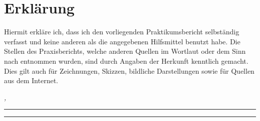 %
\chapter*{Erklärung}
\label{sec:declaration}
\thispagestyle{empty}

Hiermit erkläre ich, dass ich den vorliegenden Praktikumsbericht selbständig verfasst und keine anderen als die angegebenen Hilfsmittel benutzt habe.
Die Stellen des Praxisberichts, welche anderen Quellen im Wortlaut oder dem Sinn nach entnommen wurden, sind durch Angaben der Herkunft kenntlich gemacht.
Dies gilt auch für Zeichnungen, Skizzen, bildliche Darstellungen sowie für Quellen aus dem Internet.

\bigskip

\noindent\textit{\thesisUniversityCity, \thesisDate}

\smallskip

\begin{flushright}
	\begin{minipage}{5cm}
		\rule{\textwidth}{1pt}
		\centering\thesisName
	\end{minipage}
\end{flushright}

\medskip

\begin{flushright}
	\begin{minipage}{5cm}
		\rule{\textwidth}{1pt}
		\centering\thesisSecondReviewer
	\end{minipage}
\end{flushright}

